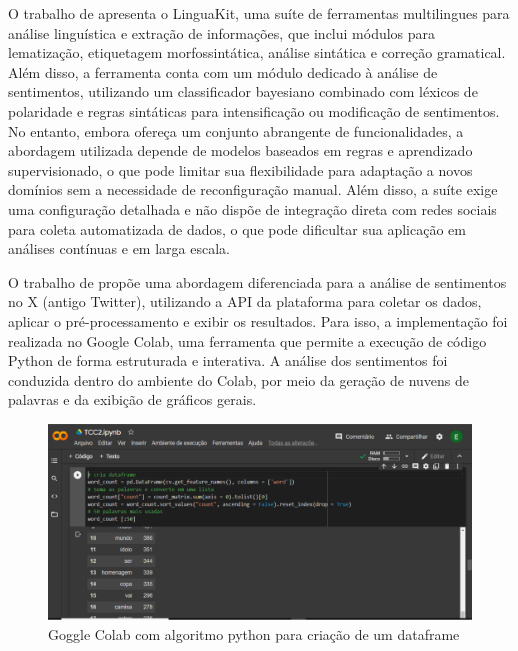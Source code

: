 \documentclass[
	12pt,				%
	oneside,			%
	a4paper,			%
	english,			%
	french,				%
	spanish,			%
	brazil				%
	]{abntex2}
\begin{document}
O trabalho de  apresenta o LinguaKit,
uma suíte de ferramentas multilingues para análise linguística e
extração de informações, que inclui módulos para lematização,
etiquetagem morfossintática, análise sintática e correção gramatical.
Além disso, a ferramenta conta com um módulo dedicado à análise de
sentimentos, utilizando um classificador bayesiano combinado com léxicos
de polaridade e regras sintáticas para intensificação ou modificação de
sentimentos. No entanto, embora ofereça um conjunto abrangente de
funcionalidades, a abordagem utilizada depende de modelos baseados em
regras e aprendizado supervisionado, o que pode limitar sua
flexibilidade para adaptação a novos domínios sem a necessidade de
reconfiguração manual. Além disso, a suíte exige uma configuração
detalhada e não dispõe de integração direta com redes sociais para
coleta automatizada de dados, o que pode dificultar sua aplicação em
análises contínuas e em larga escala.

O trabalho de  propõe uma abordagem diferenciada
para a análise de sentimentos no X (antigo Twitter), utilizando a API da
plataforma para coletar os dados, aplicar o pré-processamento e exibir
os resultados. Para isso, a implementação foi realizada no Google Colab,
uma ferramenta que permite a execução de código Python de forma
estruturada e interativa. A análise dos sentimentos foi conduzida dentro
do ambiente do Colab, por meio da geração de nuvens de palavras e da
exibição de gráficos gerais.

\begin{figure}[htbp]
\hypertarget{google_colab}{%
\caption{Goggle Colab com algoritmo python para criação de um dataframe}\label{google_colab}
\begin{center}
\includegraphics[scale=0.3]{imagens/google_colab.png}
\end{center}
}
\end{figure}
\end{document}
